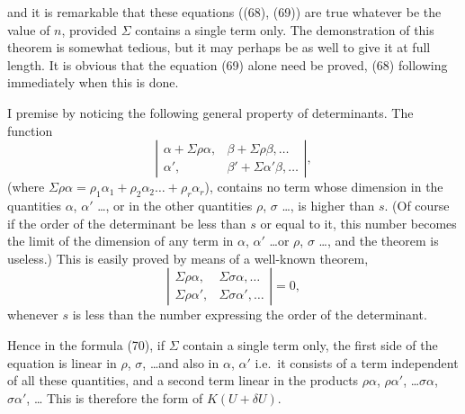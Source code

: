 \documentclass[11pt,a4paper]{book}
\begin{document}
and it is remarkable that these equations ((68), (69)) are true whatever be the value
of $n$, provided $\Sigma$ contains a single term only. The demonstration of this theorem is
somewhat tedious, but it may perhaps be as well to give it at full length. It is
obvious that the equation (69) alone need be proved, (68) following immediately when
this is done.

I premise by noticing the following general property of determinants. The function
\[
\left|\begin{array}{cc}
\alpha + \Sigma\rho\alpha, & \beta + \Sigma\rho\beta, \ldots \\
\alpha', & \beta' + \Sigma\alpha'\beta, \ldots
\end{array}\right|
\tag{70},
\]
(where $\Sigma\rho\alpha = \rho_1\alpha_1 + \rho_2\alpha_2 \ldots + \rho_r\alpha_r$), contains no term whose dimension in the quantities
$\alpha$, $\alpha'$ \ldots, or in the other quantities $\rho$, $\sigma$ \ldots, is higher than $s$. (Of course if the order
of the determinant be less than $s$ or equal to it, this number becomes the limit of
the dimension of any term in $\alpha$, $\alpha'$ \ldots or $\rho$, $\sigma$ \ldots, and the theorem is useless.) This
is easily proved by means of a well-known theorem,
\[
\left|\begin{array}{cc}
\Sigma\rho\alpha, & \Sigma\sigma\alpha, \ldots \\
\Sigma\rho\alpha', & \Sigma\sigma\alpha', \ldots
\end{array}\right| = 0 \tag{71},
\]
whenever $s$ is less than the number expressing the order of the determinant.

\newpage
Hence in the formula (70), if $\Sigma$ contain a single term only, the first side of the equation
is linear in $\rho$, $\sigma$, \ldots and also in $\alpha$, $\alpha'$ i.e.\ it consists of a term independent of
all these quantities, and a second term linear in the products $\rho\alpha$, $\rho\alpha'$, \ldots $\sigma\alpha$, $\sigma\alpha'$, \ldots
This is therefore the form of $K(U+\delta U)$.
\end{document}
